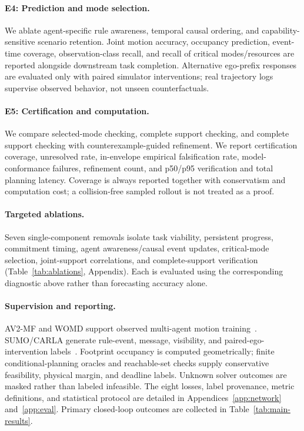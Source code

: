 \documentclass[letterpaper]{article} %
\begin{document}
\paragraph{E4: Prediction and mode selection.}
We ablate agent-specific rule awareness, temporal causal ordering, and capability-sensitive scenario retention. Joint motion accuracy, occupancy prediction, event-time coverage, observation-class recall, and recall of critical modes/resources are reported alongside downstream task completion. Alternative ego-prefix responses are evaluated only with paired simulator interventions; real trajectory logs supervise observed behavior, not unseen counterfactuals.

\paragraph{E5: Certification and computation.}
We compare selected-mode checking, complete support checking, and complete support checking with counterexample-guided refinement. We report certification coverage, unresolved rate, in-envelope empirical falsification rate, model-conformance failures, refinement count, and p50/p95 verification and total planning latency. Coverage is always reported together with conservatism and computation cost; a collision-free sampled rollout is not treated as a proof.

\paragraph{Targeted ablations.}
Seven single-component removals isolate task viability, persistent progress, commitment timing, agent awareness/causal event updates, critical-mode selection, joint-support correlations, and complete-support verification (Table~\ref{tab:ablations}, Appendix). Each is evaluated using the corresponding diagnostic above rather than forecasting accuracy alone.

\paragraph{Supervision and reporting.}
AV2-MF and WOMD support observed multi-agent motion training~\citep{wilson2023argoverse,ettinger2021large}. SUMO/CARLA generate rule-event, message, visibility, and paired-ego-intervention labels~\citep{lopez2018microscopic,dosovitskiy2017carla}. Footprint occupancy is computed geometrically; finite conditional-planning oracles and reachable-set checks supply conservative feasibility, physical margin, and deadline labels. Unknown solver outcomes are masked rather than labeled infeasible. The eight losses, label provenance, metric definitions, and statistical protocol are detailed in Appendices~\ref{app:network} and~\ref{app:eval}. Primary closed-loop outcomes are collected in Table~\ref{tab:main-results}.
\end{document}
